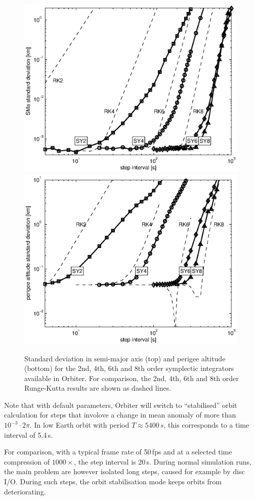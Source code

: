 \documentclass[a4paper]{article}
\begin{document}
\begin{figure}\centering
\includegraphics[width=0.99\textwidth]{sma_symp_std}
\includegraphics[width=0.99\textwidth]{pea_symp_std}
\caption{Standard deviation in semi-major axis (top) and perigee altitude (bottom) for the 2nd, 4th, 6th and 8th order symplectic integrators available in Orbiter. For comparison, the 2nd, 4th, 6th and 8th order Runge-Kutta results are shown as dashed lines.}
\label{fig:symp_err}
\end{figure}

Note that with default parameters, Orbiter will switch to ``stabilised'' orbit calculation for steps that involove a change in mean anomaly of more than $10^{-3} \cdot 2\pi$. In low Earth orbit with period $T\approx5400\,s$, this corresponds to a time interval of 5.4\,s.

For comparison, with a typical frame rate of 50\,fps and at a selected time compression of $1000\times$, the step interval is 20\,s. During normal simulation runs, the main problem are however isolated long steps, caused for example by disc I/O. During such steps, the orbit stabilisation mode keeps orbits from deteriorating. 


\end{document}
